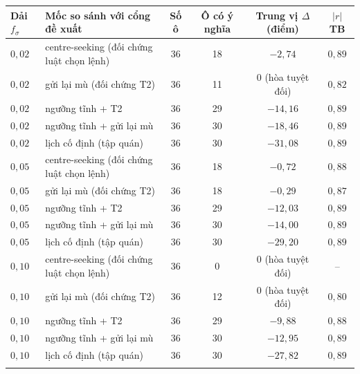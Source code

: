
\begin{tabular}{@{}llcccc@{}}
\toprule
Dải $f_\sigma$ & Mốc so sánh với cổng đề xuất & Số ô & Ô có ý nghĩa & Trung vị $\Delta$ (điểm) & $|r|$ TB \\
\midrule
$0{,}02$ & centre-seeking (đối chứng luật chọn lệnh) & 36 & 18 & $-2{,}74$ & $0{,}89$ \\
$0{,}02$ & gửi lại mù (đối chứng T2) & 36 & 11 & 0 (hòa tuyệt đối) & $0{,}82$ \\
$0{,}02$ & ngưỡng tĩnh + T2 & 36 & 29 & $-14{,}16$ & $0{,}89$ \\
$0{,}02$ & ngưỡng tĩnh + gửi lại mù & 36 & 30 & $-18{,}46$ & $0{,}89$ \\
$0{,}02$ & lịch cố định (tập quán) & 36 & 30 & $-31{,}08$ & $0{,}89$ \\
\addlinespace[2pt]
$0{,}05$ & centre-seeking (đối chứng luật chọn lệnh) & 36 & 18 & $-0{,}72$ & $0{,}88$ \\
$0{,}05$ & gửi lại mù (đối chứng T2) & 36 & 18 & $-0{,}29$ & $0{,}87$ \\
$0{,}05$ & ngưỡng tĩnh + T2 & 36 & 29 & $-12{,}03$ & $0{,}89$ \\
$0{,}05$ & ngưỡng tĩnh + gửi lại mù & 36 & 30 & $-14{,}00$ & $0{,}89$ \\
$0{,}05$ & lịch cố định (tập quán) & 36 & 30 & $-29{,}20$ & $0{,}89$ \\
\addlinespace[2pt]
$0{,}10$ & centre-seeking (đối chứng luật chọn lệnh) & 36 & 0 & 0 (hòa tuyệt đối) & -- \\
$0{,}10$ & gửi lại mù (đối chứng T2) & 36 & 12 & 0 (hòa tuyệt đối) & $0{,}80$ \\
$0{,}10$ & ngưỡng tĩnh + T2 & 36 & 29 & $-9{,}88$ & $0{,}88$ \\
$0{,}10$ & ngưỡng tĩnh + gửi lại mù & 36 & 30 & $-12{,}95$ & $0{,}89$ \\
$0{,}10$ & lịch cố định (tập quán) & 36 & 30 & $-27{,}82$ & $0{,}89$ \\
\addlinespace[2pt]
\bottomrule
\end{tabular}
